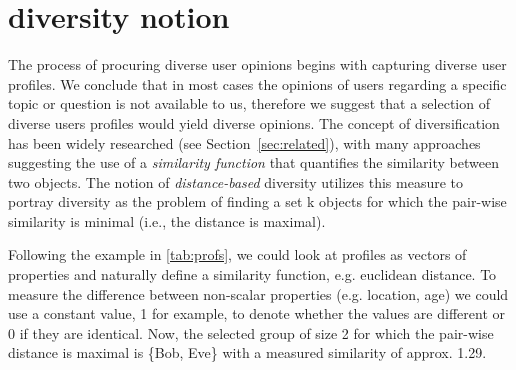 \section{diversity notion}
\label{sec:diversity}

The process of procuring diverse user opinions begins with capturing diverse user profiles. We conclude that in most cases the opinions of users regarding a specific topic or question is not available to us, therefore we suggest that a selection of diverse users profiles would yield diverse opinions. The concept of diversification has been widely researched (see Section~\ref{sec:related}), with many approaches suggesting the use of a \emph{similarity function} that quantifies the similarity between two objects. The notion of \emph{distance-based} diversity utilizes this measure to portray diversity as the problem of finding a set k objects for which the pair-wise similarity is minimal (i.e., the distance is maximal).

\begin{example}
	Following the example in \ref{tab:profs}, we could look at profiles as vectors of properties and naturally define a similarity function, e.g. euclidean distance. To measure the difference between non-scalar properties (e.g. location, age) we could use a constant value, 1 for example, to denote whether the values are different or 0 if they are identical. Now, the selected group of size 2 for which the pair-wise distance is maximal is \{Bob, Eve\} with a measured similarity of approx. 1.29.
\end{example}

